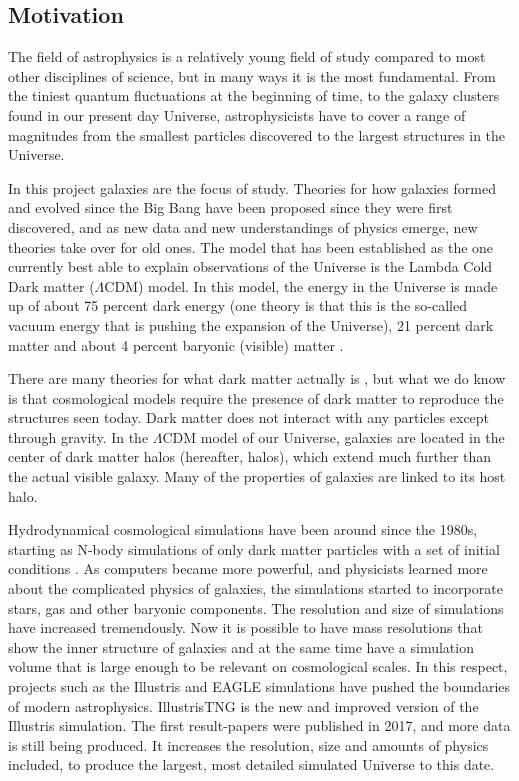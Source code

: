 
\noindent
\subsection{Motivation}
The field of astrophysics is a relatively young field of study compared to most other disciplines of science, but in many ways it is the most fundamental. From the tiniest quantum fluctuations at the beginning of time, to the galaxy clusters found in our present day Universe, astrophysicists have to cover a range of magnitudes from the smallest particles discovered to the largest structures in the Universe. 

In this project galaxies are the focus of study. Theories for how galaxies formed and evolved since the Big Bang have been proposed since they were first discovered, and as new data and new understandings of physics emerge, new theories take over for old ones. The model that has been established as the one currently best able to explain observations of the Universe is the Lambda Cold Dark matter ($\Lambda$CDM) model. In this model, the energy in the Universe is made up of about 75 percent dark energy (one theory is that this is the so-called vacuum energy that is pushing the expansion of the Universe), 21 percent dark matter and about 4 percent baryonic (visible) matter \parencite{Planck2016}. 

There are many theories for what dark matter actually is \parencite[see e.g.,][]{Boveia2018}, but what we do know is that cosmological models require the presence of dark matter to reproduce the structures seen today. Dark matter does not interact with any particles except through gravity. In the $\Lambda$CDM model of our Universe, galaxies are located in the center of dark matter halos (hereafter, halos), which extend much further than the actual visible galaxy. Many of the properties of galaxies are linked to its host halo.

Hydrodynamical cosmological simulations have been around since the 1980s, starting as N-body simulations of only dark matter particles with a set of initial conditions \parencite{Frenk1983}. As computers became more powerful, and physicists learned more about the complicated physics of galaxies, the simulations started to incorporate stars, gas and other baryonic components. The resolution and size of simulations have increased tremendously. Now it is possible to have mass resolutions that show the inner structure of galaxies and at the same time have a simulation volume that is large enough to be relevant on cosmological scales. In this respect, projects such as the Illustris and EAGLE simulations have pushed the boundaries of modern astrophysics. IllustrisTNG is the new and improved version of the Illustris simulation. The first result-papers were published in 2017, and more data is still being produced. It increases the resolution, size and amounts of physics included, to produce the largest, most detailed simulated Universe to this date. 

